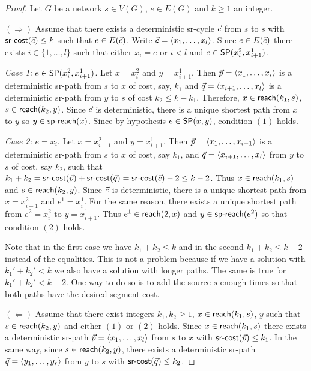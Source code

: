 \begin{proof}
Let $G$ be a network $s \in V(G)$, $e \in E(G)$ and $k \geq 1$ an integer.

$(\Rightarrow)$ Assume that there exists a deterministic sr-cycle $\sr{c}$ from $s$ to $s$
with $\cost(\sr{c}) \leq k$ such that $e \in E(\sr{c})$. Write $\sr{c} = \langle x_1, \ldots, x_l \rangle$.
Since $e \in E(\sr{c})$ there exists $i \in \{1, \ldots, l\}$ such that either $x_i = e$ or $i < l$ and
$e \in \sp(x^2_{i}, x^1_{i + 1})$.

\emph{Case 1:} $e \in \sp(x^2_{i}, x^1_{i + 1})$. Let $x = x^2_{i}$ and $y = x^1_{i + 1}$. Then $\sr{p} = \langle x_1, \ldots, x_{i} \rangle$ is a deterministic sr-path
from $s$ to $x$ of cost, say, $k_1$ and $\sr{q} = \langle x_{i + 1}, \ldots, x_l \rangle$ is a deterministic sr-path from $y$ to $s$ of cost $k_2 \leq k - k_1$. 
Therefore, $x \in \nreach(k_1, s)$, $s \in \nreach(k_2, y)$. Since $\sr{c}$ is deterministic, there is a unique shortest path
from $x$ to $y$ so $y \in \spreach(x)$. Since by hypothesis $e \in \sp(x, y)$, condition $(1)$ holds.

\emph{Case 2:} $e = x_i$. Let $x = x^2_{i - 1}$ and $y = x^1_{i + 1}$. Then $\sr{p} = \langle x_1, \ldots, x_{i - 1} \rangle$ is a deterministic sr-path
from $s$ to $x$ of cost, say $k_1$, and $\sr{q} = \langle x_{i + 1}, \ldots, x_l \rangle$ from $y$ to $s$ of cost, say $k_2$, such that
$k_1 + k_2 = \cost(\sr{p}) + \cost(\sr{q}) = \cost(\sr{c}) - 2 \leq k - 2$. Thus $x \in \nreach(k_1, s)$ and $s \in \nreach(k_2, y)$.
Since $\sr{c}$ is deterministic, there is a unique shortest path from $x = x^2_{i - 1}$ and $e^1 = x^1_i$. For the same reason,
there exists a unique shortest path from $e^2 = x^2_i$ to $y = x^1_{i + 1}$.  Thus $e^1 \in \nreach(2, x)$ and $y \in \spreach(e^2)$ so that
condition $(2)$ holds.

Note that in the first case we have $k_1 + k_2 \leq k$ and in the second $k_1 + k_2 \leq k - 2$ instead of the equalities. 
This is not a problem because if we have a solution with $k_1' + k_2' < k$ we also have a solution with longer paths. The same is
true for $k_1' + k_2' < k - 2$. One way to do so is to add the source $s$ enough times so that both paths have the desired segment cost.

$(\Leftarrow)$ Assume that there exist integers $k_1, k_2 \geq 1$, $x \in \nreach(k_1, s)$, $y$ such that $s \in \nreach(k_2, y)$ 
and either $(1)$ or $(2)$ holds. Since $x \in \nreach(k_1, s)$ there exists a deterministic sr-path
$\sr{p} = \langle x_1, \ldots, x_l \rangle$ from $s$ to $x$ with $\cost(\sr{p}) \leq k_1$. In the same way, since $s \in \nreach(k_2, y)$,
there exists a deterministic sr-path $\sr{q} = \langle y_1, \ldots, y_r \rangle$ from $y$ to $s$ with $\cost(\sr{q}) \leq k_2$.


\end{proof}
